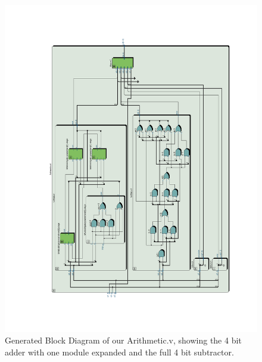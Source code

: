 \documentclass[11pt]{article}
\begin{document}
\begin{figure}[H]
    \centering
        \includegraphics[clip, trim=3cm 3cm 2cm 3cm, angle=270,  width=\textwidth]{Arithmetic}
        \caption{Generated Block Diagram of our Arithmetic.v, showing the 4 bit adder with one module expanded and the full 4 bit subtractor.}
    \label{fig:arithmeticgen}
\end{figure}
\end{document}
